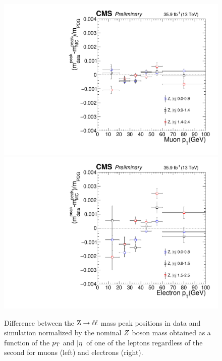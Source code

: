 \begin{figure}[!htb]
\begin{center}
\includegraphics[width=0.44\linewidth]{Figures/Results/mass/lepScale_vs_pt_eta_mu.pdf}
\includegraphics[width=0.44\linewidth]{Figures/Results/mass/lepScale_vs_pt_eta_e.pdf}
\caption{ Difference between the ${\rm Z}\rightarrow\ell\ell$ mass peak positions in data and simulation normalized by the 
nominal $Z$ boson mass obtained as a function of the $p_{\rm{T}}$ and $|\eta|$ of one of the leptons regardless of the second
for muons (left) and electrons (right).
\label{fig:lepScale}}
\end{center}
\end{figure}

